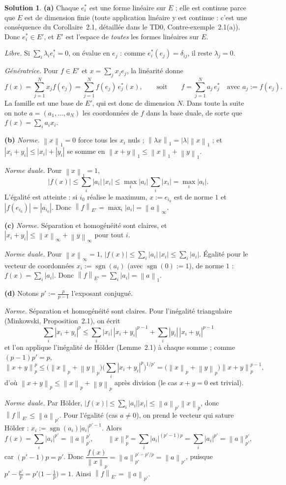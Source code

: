 \documentclass[11pt,a4paper]{article}
\newcommand{\norm}[1]{\left\|#1\right\|}
\DeclareMathOperator{\sgn}{sgn}
\theoremstyle{definition}
\newtheorem*{solution}{Solution}
\begin{document}
\begin{solution}
\noindent\textbf{(a)} Chaque $e_i^*$ est une forme linéaire sur $E$ ; elle est continue parce que $E$ est de dimension finie (toute application linéaire y est continue : c'est une conséquence du Corollaire~2.1, détaillée dans le TD0, Contre-exemple~2.1(a)). Donc $e_i^*\in E'$, et $E'$ est l'espace de \emph{toutes} les formes linéaires sur $E$.

\emph{Libre.} Si $\sum_i\lambda_ie_i^*=0$, on évalue en $e_j$ : comme $e_i^*(e_j)=\delta_{ij}$, il reste $\lambda_j=0$.

\emph{Génératrice.} Pour $f\in E'$ et $x=\sum_jx_je_j$, la linéarité donne
\[
f(x)=\sum_{j=1}^Nx_jf(e_j)=\sum_{j=1}^Nf(e_j)\,e_j^*(x),\qquad\text{soit}\qquad f=\sum_{j=1}^Na_j\,e_j^*\quad\text{avec }a_j:=f(e_j) .
\]
La famille est une base de $E'$, qui est donc de dimension $N$. Dans toute la suite on note $a=(a_1,\dots,a_N)$ les coordonnées de $f$ dans la base duale, de sorte que $f(x)=\sum_ia_ix_i$.

\medskip
\noindent\textbf{(b)} \emph{Norme.} $\norm x_1=0$ force tous les $x_i$ nuls ; $\norm{\lambda x}_1=|\lambda|\norm x_1$ ; et $|x_i+y_i|\le|x_i|+|y_i|$ se somme en $\norm{x+y}_1\le\norm x_1+\norm y_1$.

\emph{Norme duale.} Pour $\norm x_1=1$,
\[
|f(x)|\le\sum_i|a_i|\,|x_i|\le\max_i|a_i|\,\sum_i|x_i|=\max_i|a_i| .
\]
L'égalité est atteinte : si $i_0$ réalise le maximum, $x:=e_{i_0}$ est de norme $1$ et $|f(e_{i_0})|=|a_{i_0}|$. Donc $\norm f_{E'}=\max_i|a_i|=\norm a_\infty$.

\medskip
\noindent\textbf{(c)} \emph{Norme.} Séparation et homogénéité sont claires, et $|x_i+y_i|\le\norm x_\infty+\norm y_\infty$ pour tout $i$.

\emph{Norme duale.} Pour $\norm x_\infty=1$, $|f(x)|\le\sum_i|a_i|\,|x_i|\le\sum_i|a_i|$. Égalité pour le vecteur de coordonnées $x_i:=\sgn(a_i)$ (avec $\sgn(0):=1$), de norme $1$ : $f(x)=\sum_i|a_i|$. Donc $\norm f_{E'}=\sum_i|a_i|=\norm a_1$.

\medskip
\noindent\textbf{(d)} Notons $p':=\frac p{p-1}$ l'exposant conjugué.

\emph{Norme.} Séparation et homogénéité sont claires. Pour l'inégalité triangulaire (Minkowski, Proposition~2.1), on écrit
\[
\sum_i|x_i+y_i|^p\le\sum_i|x_i|\,|x_i+y_i|^{p-1}+\sum_i|y_i|\,|x_i+y_i|^{p-1}
\]
et l'on applique l'inégalité de Hölder (Lemme~2.1) à chaque somme ; comme $(p-1)p'=p$,
\[
\norm{x+y}_p^p\le\big(\norm x_p+\norm y_p\big)\Big(\sum_i|x_i+y_i|^p\Big)^{1/p'}=\big(\norm x_p+\norm y_p\big)\norm{x+y}_p^{p-1},
\]
d'où $\norm{x+y}_p\le\norm x_p+\norm y_p$ après division (le cas $x+y=0$ est trivial).

\emph{Norme duale.} Par Hölder, $|f(x)|\le\sum_i|a_i||x_i|\le\norm a_{p'}\norm x_p$, donc $\norm f_{E'}\le\norm a_{p'}$. Pour l'égalité (cas $a\ne0$), on prend le vecteur qui sature Hölder : $x_i:=\sgn(a_i)|a_i|^{p'-1}$. Alors
\[
f(x)=\sum_i|a_i|^{p'}=\norm a_{p'}^{p'},\qquad\norm x_p^p=\sum_i|a_i|^{(p'-1)p}=\sum_i|a_i|^{p'}=\norm a_{p'}^{p'},
\]
car $(p'-1)p=p'$. Donc $\dfrac{f(x)}{\norm x_p}=\norm a_{p'}^{p'-p'/p}=\norm a_{p'}$, puisque $p'-\frac{p'}p=p'\big(1-\frac1p\big)=1$. Ainsi $\norm f_{E'}=\norm a_{p'}$.
\end{solution}
\end{document}
